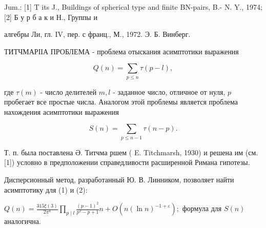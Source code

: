 \documentclass[10pt]{article}
\begin{document}
Jum.: [1] T its J., Buildings of spherical type and finite BN-pairs, B.- N. Y., 1974; [2] Б у р б а к и Н., Группы и

алгебры Ли, гл. IV, пер. с франц., М., 1972. Э. Б. Винберг.



ТИТЧМАРІІА ПРОБЛЕМА - проблема отыскания асимптотики выражения



\[

Q(n)=\sum_{p \leqslant n} \tau(p-l),

\]



где $\tau(m)$ - число делителей $m, l$ - заданное число, отличное от нуля, $p$ пробегает все простые числа. Аналогом этой проблемы является проблема нахождения асимптотики выражения



\[

S(n)=\sum_{p \leqslant n-1} \tau(n-p) .

\]



Т. п. была поставлена Ә. Титчма ршем ( E. Titchmarsh, 1930) и решена им (см. [1]) условно в предположении справедливости расширенной Римана гипотезы.



Дисперсионный метод, разработанный Ю. В. Линником, позволяет найти асимптотику для (1) и (2):



$Q(n)=\frac{315 \xi(3)}{2 \pi^{4}} \prod_{p \mid l} \frac{(p-1)^{2}}{p^{2}-p+1} n+O\left(n(\ln n)^{-1+\varepsilon}\right) ;$ формула для $S(n)$ аналогична.
\end{document}
